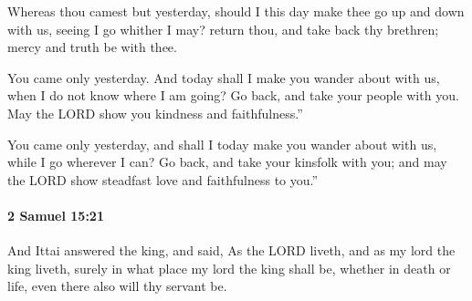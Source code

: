 			\begin{versebox}
					\item[BHS] 
					\item[ASV] Whereas thou camest but yesterday, should I this day make thee go up and down with us, seeing I go whither I may? return thou, and take back thy brethren; mercy and truth be with thee.
					\item[NIV] You came only yesterday. And today shall I make you wander about with us, when I do not know where I am going? Go back, and take your people with you. May the LORD show you kindness and faithfulness.”
					\item[NRSV] You came only yesterday, and shall I today make you wander about with us, while I go wherever I can? Go back, and take your kinsfolk with you; and may the LORD show steadfast love and faithfulness to you.”
			\end{versebox}

		\paragraph{2 Samuel 15:21} %
			\label{2SAMUEL-15-21}

			And Ittai answered the king, and said, As the LORD liveth, and as my lord the king liveth, surely in what place my lord the king shall be, whether in death or life, even there also will thy servant be.

